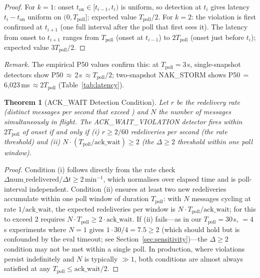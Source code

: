 \documentclass[journal]{IEEEtran}
\newtheorem{theorem}{Theorem}
\begin{document}
\begin{proof}
For $k{=}1$: onset $t_\text{on} \in [t_{i-1}, t_i)$ is uniform, so
detection at $t_i$ gives latency $t_i - t_\text{on}$ uniform on
$(0, T_\text{poll}]$; expected value $T_\text{poll}/2$.
For $k{=}2$: the violation is first confirmed at $t_{i+1}$ (one full
interval after the poll that first sees it). The latency from onset to
$t_{i+1}$ ranges from $T_\text{poll}$ (onset at $t_{i-1}$) to
$2T_\text{poll}$ (onset just before $t_i$); expected value
$3T_\text{poll}/2$.
\end{proof}

\textit{Remark.} The empirical P50 values confirm this: at
$T_\text{poll}{=}3$\,s, single-snapshot detectors show
P50\,$\approx$\,2\,s\,$\approx T_\text{poll}/2$; two-snapshot NAK\_STORM
shows P50\,$=$\,6{,}023\,ms\,$\approx 2T_\text{poll}$ (Table~\ref{tab:latency}).

\begin{theorem}[ACK\_WAIT Detection Condition]
\label{thm:ackwait_cond}
Let $r$ be the redelivery rate (distinct messages per second that exceed
) and $N$ the number of messages simultaneously in flight.
The ACK\_WAIT\_VIOLATION detector fires within $2T_\text{poll}$ of onset
if and only if (i) $r \geq 2/60$ redeliveries per second (the rate
threshold) and (ii) $N \cdot (T_\text{poll} / \text{ack\_wait}) \geq 2$
(the $\Delta \geq 2$ threshold within one poll window).
\end{theorem}

\begin{proof}
Condition (i) follows directly from the rate check $\Delta
\text{num\_redelivered}/\Delta t \geq 2$\,min$^{-1}$, which normalises
over elapsed time and is poll-interval independent.
Condition (ii) ensures at least two new redeliveries accumulate within
one poll window of duration $T_\text{poll}$: with $N$ messages cycling
at rate $1/\text{ack\_wait}$, the expected redeliveries per window is
$N \cdot T_\text{poll}/\text{ack\_wait}$; for this to exceed 2 requires
$N \cdot T_\text{poll} \geq 2 \cdot \text{ack\_wait}$.
If (ii) fails---as in our $T_\text{poll}{=}30$\,s,
${=}4$\,s experiments where $N{=}1$ gives
$1\cdot 30/4{=}7.5 \geq 2$ (which should hold but is confounded
by the eval timeout; see Section~\ref{sec:sensitivity})---the
$\Delta\geq 2$ condition may not be met within a single poll.
In production, where violations persist indefinitely and $N$ is
typically $\gg 1$, both conditions are almost always satisfied at
any $T_\text{poll} \leq \text{ack\_wait}/2$.
\end{proof}
\end{document}
